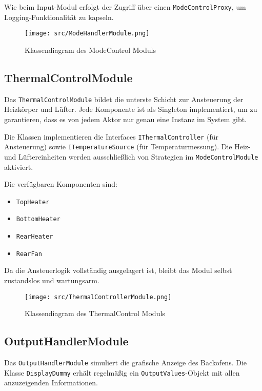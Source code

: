 \documentclass[a4paper,12pt]{article}
\begin{document}
Wie beim Input-Modul erfolgt der Zugriff über einen \texttt{ModeControlProxy}, um Logging-Funktionalität zu kapseln.

\begin{figure}[h!]
  \centering
  \texttt{[image: src/ModeHandlerModule.png]}
  \caption{Klassendiagram des ModeControl Moduls}
  \label{fig:modecontrolmodule}
\end{figure}

\clearpage
\newpage

\subsection*{ThermalControlModule}

Das \texttt{ThermalControlModule} bildet die unterste Schicht zur Ansteuerung der Heizkörper und Lüfter. Jede Komponente ist als Singleton implementiert, um zu garantieren, dass es von jedem Aktor nur genau eine Instanz im System gibt.

Die Klassen implementieren die Interfaces \texttt{IThermalController} (für Ansteuerung) sowie \texttt{ITemperatureSource} (für Temperaturmessung). Die Heiz- und Lüftereinheiten werden ausschließlich von Strategien im \texttt{ModeControlModule} aktiviert.

Die verfügbaren Komponenten sind:

\begin{itemize}
    \item \texttt{TopHeater}
    \item \texttt{BottomHeater}
    \item \texttt{RearHeater}
    \item \texttt{RearFan}
\end{itemize}

Da die Ansteuerlogik vollständig ausgelagert ist, bleibt das Modul selbst zustandslos und wartungsarm.

\begin{figure}[h!]
  \centering
  \texttt{[image: src/ThermalControllerModule.png]}
  \caption{Klassendiagram des ThermalControl Moduls}
  \label{fig:thermalcontrolmodule}
\end{figure}

\newpage

\subsection*{OutputHandlerModule}

Das \texttt{OutputHandlerModule} simuliert die grafische Anzeige des Backofens. Die Klasse \texttt{DisplayDummy} erhält regelmäßig ein \texttt{OutputValues}-Objekt mit allen anzuzeigenden Informationen.
\end{document}
